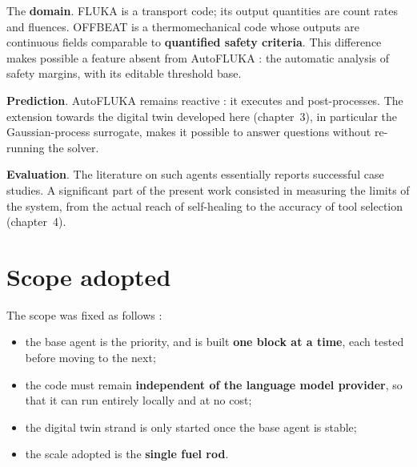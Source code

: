 The \textbf{domain}. FLUKA is a transport code; its output quantities are count
rates and fluences. OFFBEAT is a thermomechanical code whose outputs are
continuous fields comparable to \textbf{quantified safety criteria}. This
difference makes possible a feature absent from AutoFLUKA : the automatic
analysis of safety margins, with its editable threshold base.

\textbf{Prediction}. AutoFLUKA remains reactive : it executes and post-processes.
The extension towards the digital twin developed here (chapter~3), in particular
the Gaussian-process surrogate, makes it possible to answer questions without
re-running the solver.

\textbf{Evaluation}. The literature on such agents essentially reports
successful case studies. A significant part of the present work consisted in
measuring the limits of the system, from the actual reach of self-healing to the
accuracy of tool selection (chapter~4).

\section{Scope adopted}

The scope was fixed as follows :
\begin{itemize}
  \item the base agent is the priority, and is built \textbf{one block at a
    time}, each tested before moving to the next;
  \item the code must remain \textbf{independent of the language model
    provider}, so that it can run entirely locally and at no cost;
  \item the digital twin strand is only started once the base agent is stable;
  \item the scale adopted is the \textbf{single fuel rod}.
\end{itemize}

\clearpage
